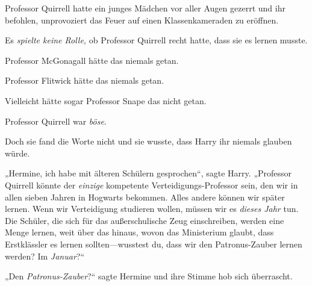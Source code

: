 Professor Quirrell hatte ein junges Mädchen vor aller Augen gezerrt und ihr befohlen, unprovoziert das Feuer auf einen Klassenkameraden zu eröffnen.

Es \emph{spielte keine Rolle,} ob Professor Quirrell recht hatte, dass sie es lernen musste.

Professor McGonagall hätte das niemals getan.

Professor Flitwick hätte das niemals getan.

Vielleicht hätte sogar Professor Snape das nicht getan.

Professor Quirrell war \emph{böse}.

Doch sie fand die Worte nicht und sie wusste, dass Harry ihr niemals glauben würde.

„Hermine, ich habe mit älteren Schülern gesprochen“, sagte Harry. „Professor Quirrell könnte der \emph{einzige} kompetente Verteidigungs-Professor sein, den wir in allen sieben Jahren in Hogwarts bekommen. Alles andere können wir später lernen. Wenn wir Verteidigung studieren wollen, müssen wir es \emph{dieses Jahr} tun. Die Schüler, die sich für das außerschulische Zeug einschreiben, werden eine Menge lernen, weit über das hinaus, wovon das Ministerium glaubt, dass Erstklässler es lernen sollten—wusstest du, dass wir den Patronus-Zauber lernen werden? Im \emph{Januar}?“

„Den \emph{Patronus-Zauber}?“ sagte Hermine und ihre Stimme hob sich überrascht.

